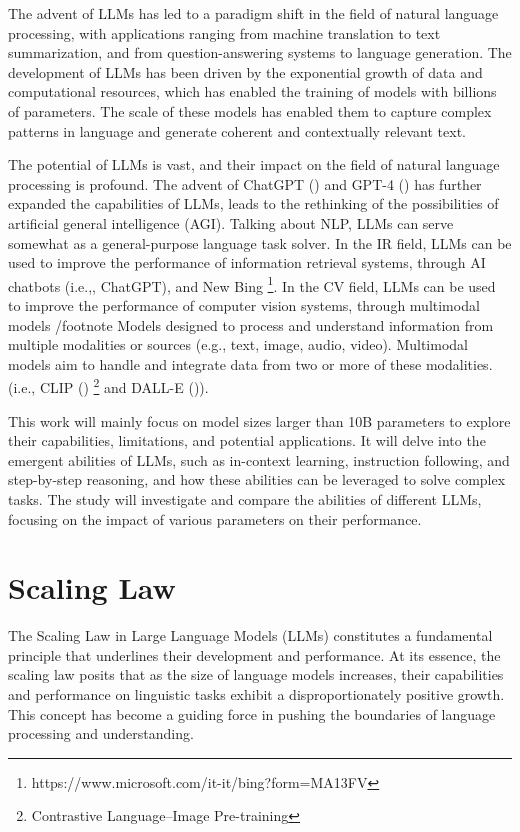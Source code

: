 The advent of LLMs has led to a paradigm shift in the field of natural language processing, with applications ranging from machine translation to text summarization, and from question-answering systems to language generation.
The development of LLMs has been driven by the exponential growth of data and computational resources, which has enabled the training of models with billions of parameters.
The scale of these models has enabled them to capture complex patterns in language and generate coherent and contextually relevant text.

The potential of LLMs is vast, and their impact on the field of natural language processing is profound.
The advent of ChatGPT (\textcite{chatgpt}) and GPT-4 (\textcite{gpt4}) has further expanded the capabilities of LLMs, leads to the rethinking of the possibilities of artificial general intelligence (AGI).
Talking about NLP, LLMs can serve somewhat as a general-purpose language task solver.
In the IR field, LLMs can be used to improve the performance of information retrieval systems, through AI chatbots (i.e.,, ChatGPT), and New Bing \footnote{https://www.microsoft.com/it-it/bing?form=MA13FV}.
In the CV field, LLMs can be used to improve the performance of computer vision systems, through multimodal models /footnote{
Models designed to process and understand information from multiple modalities or sources (e.g., text, image, audio, video).
Multimodal models aim to handle and integrate data from two or more of these modalities.
} (i.e., CLIP (\textcite{clip}) \footnote{Contrastive Language–Image Pre-training} and DALL-E (\textcite{dall-e})).

This work will mainly focus on model sizes larger than 10B parameters to explore their capabilities, limitations, and potential applications.
It will delve into the emergent abilities of LLMs, such as in-context learning, instruction following, and step-by-step reasoning, and how these abilities can be leveraged to solve complex tasks.
The study will investigate and compare the abilities of different LLMs, focusing on the impact of various parameters on their performance.


\section{Scaling Law}
\label{sec:scaling-law-in-large-language-models}

The Scaling Law in Large Language Models (LLMs) constitutes a fundamental principle that underlines their development and performance.
At its essence, the scaling law posits that as the size of language models increases, their capabilities and performance on linguistic tasks exhibit a disproportionately positive growth.
This concept has become a guiding force in pushing the boundaries of language processing and understanding.

